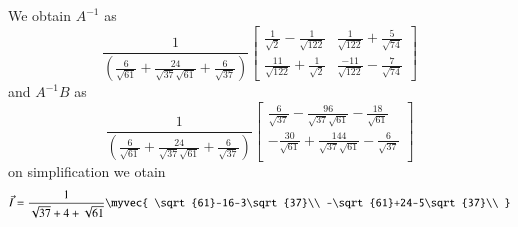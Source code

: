 \documentclass[journal,12pt,twocolumn]{IEEEtran}
\begin{document}
\begin{flushleft}
We obtain $A^{-1}$ as
$$
\frac{1}{(\frac{6}{\sqrt{61}}+\frac{24}{\sqrt{37}\sqrt{61}}+\frac{6}{\sqrt{37}})}
\begin{bmatrix}
\frac{1}{\sqrt{2}}-\frac{1}{\sqrt{122}} & \frac{1}{\sqrt{122}}+\frac{5}{\sqrt{74}}\\
\frac{11}{\sqrt{122}}+\frac{1}{\sqrt{2}} & \frac{-11}{\sqrt{122}}-\frac{7}{\sqrt{74}}
\end{bmatrix}
$$
and $A^{-1}B$ as
$$
\frac{1}{(\frac{6}{\sqrt{61}}+\frac{24}{\sqrt{37}\sqrt{61}}+\frac{6}{\sqrt{37}})}
\begin{bmatrix}
\frac{6}{\sqrt{37}}-\frac{96}{\sqrt{37}\sqrt{61}}-\frac{18}{\sqrt{61}}\\
-\frac{30}{\sqrt{61}}+\frac{144}{\sqrt{37}\sqrt{61}}-\frac{6}{\sqrt{37}}\\
\end{bmatrix}
$$
on simplification we otain
\begin{align}
\vec{I}=\frac{1}{\sqrt{37}+4+\sqrt{61}}
\myvec{
\sqrt{61}-16-3\sqrt{37}\\
-\sqrt{61}+24-5\sqrt{37}\\
}
\end{align}

\end{flushleft}
\end{document}
